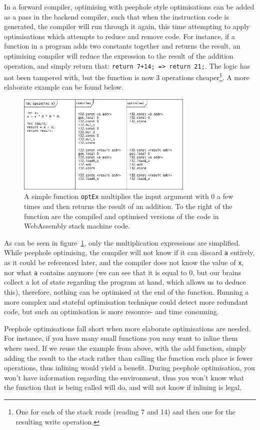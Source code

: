\documentclass[a4paper]{article}
\begin{document}
In a forward compiler, optimising with peephole style optimisations can be added as a pass in the backend compiler, such that when the instruction code is generated, the compiler will run through it again, this time attempting to apply optimisations which attempts to reduce and remove code. For instance, if a function in a program adds two constants together and returns the result, an optimising compiler will reduce the expression to the result of the addition operation, and simply return that: \texttt{return 7+14; => return 21;}. The logic has not been tampered with, but the function is now 3 operations cheaper\footnote{One for each of the stack reads (reading 7 and 14) and then one for the resulting write operation.}. A more elaborate example can be found below.

\begin{figure}[H]
	\includegraphics[width=0.75\textwidth]{PeepholeOptimisation}
	\centering
	\caption{A simple function \texttt{optEx} multiplies the input argument with $0$ a few times and then returns the result of an addition. To the right of the function are the compiled and optimised versions of the code in WebAssembly stack machine code.}
\label{fig:peephole-optimisation}
\end{figure}
As can be seen in figure~\ref{fig:peephole-optimisation}, only the multiplication expressions are simplified. While peephole optimising, the compiler will not know if it can discard \texttt{a} entirely, as it could be referenced later, and the compiler does not know the value of \texttt{x}, nor what \texttt{a} contains anymore (we can see that it is equal to $0$, but our brains collect a lot of state regarding the program at hand, which allows us to deduce this), therefore, nothing can be optimised at the end of the function. Running a more complex and stateful optimisation technique could detect more redundant code, but such an optimisation is more resource- and time consuming.

Peephole optimisations fall short when more elaborate optimisations are needed. For instance, if you have many small functions you may want to inline them where used. If we reuse the example from above, with the add function, simply adding the result to the stack rather than calling the function each place is fewer operations, thus inlining would yield a benefit. During peephole optimisation, you won't have information regarding the environment, thus you won’t know what the function that is being called will do, and will not know if inlining is legal.
\end{document}
